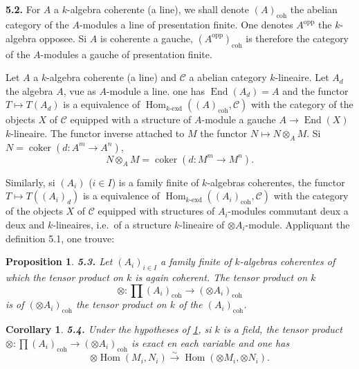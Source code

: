 \documentclass[12pt,a4paper]{article}
\theoremstyle{plain}
\newtheorem{proposition}[theorem]{Proposition}
\newtheorem{corollary}[theorem]{Corollary}
\theoremstyle{definition}
\theoremstyle{remark}
\DeclareMathOperator{\Hom}{Hom}
\DeclareMathOperator{\End}{End}
\DeclareMathOperator{\coker}{coker}
\begin{document}
\subsection{}

\textbf{5.2.} For $A$ a $k$-algebra coherente (a line), we shall denote $(A)_\mathrm{coh}$ the abelian category of the $A$-modules a line of presentation finite. One denotes $A^\mathrm{opp}$ the $k$-algebra opposee. Si $A$ is coherente a gauche, $(A^\mathrm{opp})_\mathrm{coh}$ is therefore the category of the $A$-modules a gauche of presentation finite.

Let $A$ a $k$-algebra coherente (a line) and $\mathcal{C}$ a abelian category $k$-lineaire. Let $A_d$ the algebra $A$, vue as $A$-module a line. one has $\End(A_d) = A$ and the functor $T \mapsto T(A_d)$ is a equivalence of $\Hom_{k\text{-}\mathrm{exd}}((A)_\mathrm{coh}, \mathcal{C})$ with the category of the objects $X$ of $\mathcal{C}$ equipped with a structure of $A$-module a gauche $A \to \End(X)$ $k$-lineaire. The functor inverse attached to $M$ the functor $N \mapsto N \otimes_A M$. Si $N = \coker(d : A^m \to A^n)$,
\[
N \otimes_A M = \coker(d : M^m \to M^n).
\]

Similarly, si $(A_i)$ ($i \in I$) is a family finite of $k$-algebras coherentes, the functor $T \mapsto T((A_i)_d)$ is a equivalence of $\Hom_{k\text{-}\mathrm{exd}}((A_i)_\mathrm{coh}, \mathcal{C})$ with the category of the objects $X$ of $\mathcal{C}$ equipped with structures of $A_i$-modules commutant deux a deux and $k$-lineaires, i.e.~of a structure $k$-lineaire of $\otimes A_i$-module. Appliquant the definition 5.1, one trouve:

\begin{proposition}\label{prop:5.3}
\textbf{5.3.} Let $(A_i)_{i \in I}$ a family finite of $k$-algebras coherentes of which the tensor product on $k$ is again coherent. The tensor product on $k$
\[
\otimes : \prod (A_i)_\mathrm{coh} \to (\otimes A_i)_\mathrm{coh}
\]
is of $(\otimes A_i)_\mathrm{coh}$ the tensor product on $k$ of the $(A_i)_\mathrm{coh}$.
\end{proposition}

\begin{corollary}\label{cor:5.4}
\textbf{5.4.} Under the hypotheses of \ref{prop:5.3}, si $k$ is a field, the tensor product $\otimes : \prod (A_i)_\mathrm{coh} \to (\otimes A_i)_\mathrm{coh}$ is exact en each variable and one has
\begin{equation}\label{eq:5.4.1}
\otimes \Hom(M_i, N_i) \xrightarrow{\sim} \Hom(\otimes M_i, \otimes N_i).
\end{equation}
\end{corollary}
\end{document}
